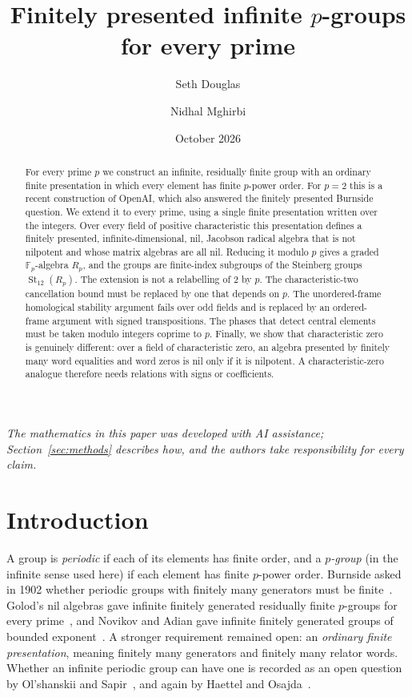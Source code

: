 \documentclass[11pt]{article}
\title{Finitely presented infinite $p$-groups for every prime}
\author{Seth Douglas \and Nidhal Mghirbi}
\date{October 2026}
\numberwithin{equation}{section}
\theoremstyle{definition}
\theoremstyle{remark}
\newcommand{\F}{\mathbb F}
\DeclareMathOperator{\St}{St}
\begin{document}
\maketitle

\begin{abstract}
For every prime $p$ we construct an infinite, residually finite group with an ordinary finite presentation in which every
element has finite $p$-power order. For $p=2$ this is a recent construction of OpenAI, which also answered the finitely
presented Burnside question. We extend it to every prime, using a single finite presentation written over the
integers. Over every field of positive characteristic this presentation defines a finitely presented,
infinite-dimensional, nil, Jacobson radical algebra that is not nilpotent and whose matrix algebras are all nil.
Reducing it modulo $p$ gives a graded $\F_p$-algebra $R_p$, and the groups are finite-index subgroups of the Steinberg
groups $\St_{12}(R_p)$. The
extension is not a relabelling of $2$ by $p$. The characteristic-two cancellation bound must be replaced by one that depends on
$p$. The unordered-frame homological stability argument fails over odd fields and is replaced
by an ordered-frame argument with signed transpositions. The phases that detect central elements must be taken modulo
integers coprime to $p$. Finally, we show that characteristic zero is genuinely different: over a field of characteristic zero, an algebra
presented by finitely many word equalities and word zeros is nil only if it is nilpotent. A characteristic-zero analogue
therefore needs relations with signs or coefficients.
\end{abstract}

\noindent\emph{The mathematics in this paper was developed with AI assistance; Section~\ref{sec:methods} describes how,
and the authors take responsibility for every claim.}

\setcounter{tocdepth}{1}
{\small\tableofcontents}

\section{Introduction}\label{sec:intro}

A group is \emph{periodic} if each of its elements has finite order, and a \emph{$p$-group} (in the infinite sense used
here) if each element has finite $p$-power order. Burnside asked in 1902 whether periodic groups with finitely many
generators must be finite~\cite{Burnside1902}. Golod's nil algebras gave infinite finitely generated residually finite
$p$-groups for every prime~\cite{Golod1964,GolodShafarevich1964}, and Novikov and Adian gave infinite finitely generated
groups of bounded exponent~\cite{NovikovAdian1968}. A stronger requirement remained open: an \emph{ordinary finite
presentation}, meaning finitely many generators and finitely many relator words. Whether an infinite periodic group can
have one is recorded as an open question by Ol'shanskii and Sapir~\cite[p.~45]{OlshanskiiSapir2003}, and again by
Haettel and Osajda~\cite[Section~2.2(IX)]{HaettelOsajda2025}.
\end{document}

